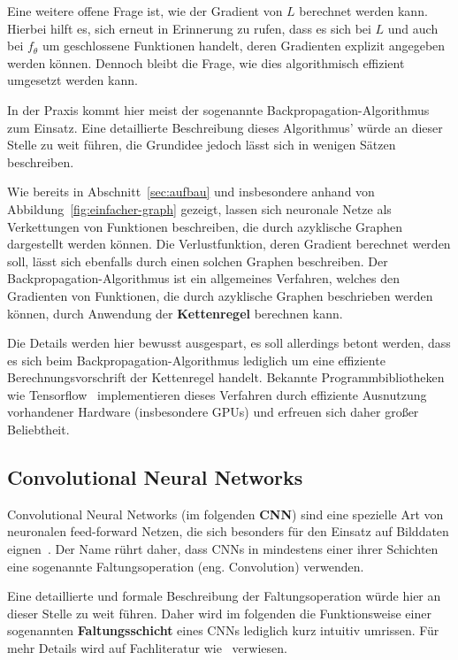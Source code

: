 Eine weitere offene Frage ist, wie der Gradient von $L$ berechnet werden
kann. Hierbei hilft es, sich erneut in Erinnerung zu rufen, dass es sich
bei $L$ und auch bei $f_\theta$ um geschlossene Funktionen handelt,
deren Gradienten explizit angegeben werden k\"onnen.
Dennoch bleibt die Frage, wie dies algorithmisch effizient umgesetzt werden
kann.

In der Praxis kommt hier meist der sogenannte
Backpropagation-Algorithmus~\cite{backpropagation} zum Einsatz.
Eine detaillierte Beschreibung dieses Algorithmus' w\"urde an dieser
Stelle zu weit f\"uhren, die Grundidee jedoch l\"asst sich in wenigen
S\"atzen beschreiben.

Wie bereits in Abschnitt~\ref{sec:aufbau} und insbesondere anhand von
Abbildung~\ref{fig:einfacher-graph} gezeigt, lassen sich neuronale Netze
als Verkettungen von Funktionen beschreiben, die durch
azyklische Graphen dargestellt werden k\"onnen.
Die Verlustfunktion, deren Gradient berechnet werden soll, l\"asst sich
ebenfalls durch einen solchen Graphen beschreiben.
Der Backpropagation-Algorithmus ist ein allgemeines Verfahren, welches den
Gradienten von
Funktionen, die durch azyklische Graphen beschrieben werden k\"onnen,
durch Anwendung der \textbf{Kettenregel} berechnen kann.

Die Details werden hier bewusst ausgespart, es soll allerdings betont
werden, dass es sich beim Backpropagation-Algorithmus lediglich um eine
effiziente Berechnungsvorschrift der Kettenregel handelt.
Bekannte Programmbibliotheken wie Tensorflow~\cite{tensorflow2015-whitepaper}
implementieren dieses Verfahren durch effiziente Ausnutzung vorhandener
Hardware (insbesondere GPUs) und erfreuen sich daher
gro{\ss}er Beliebtheit.

\subsection{Convolutional Neural Networks}
\label{sec:cnns}

Convolutional Neural Networks (im folgenden \textbf{CNN}) sind eine
spezielle Art von neuronalen feed-forward Netzen, die sich besonders f\"ur den
Einsatz auf Bilddaten eignen~\cite{Goodfellow-et-al-2016}.
Der Name r\"uhrt daher, dass CNNs in mindestens einer ihrer Schichten
eine sogenannte Faltungsoperation (eng. Convolution) verwenden.

Eine detaillierte und formale Beschreibung der Faltungsoperation w\"urde
hier an dieser Stelle zu weit f\"uhren. Daher wird im folgenden
die Funktionsweise einer sogenannten \textbf{Faltungsschicht} eines
CNNs lediglich kurz intuitiv umrissen. F\"ur mehr Details wird auf
Fachliteratur wie~\cite{Goodfellow-et-al-2016} verwiesen.

